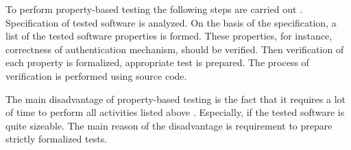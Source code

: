 %
To perform property-based testing the following steps are carried out . 
%
Specification of tested software is analyzed. 
%
On the basis of the specification, a list of the tested software properties is formed. 
%
These properties, for instance, correctness of authentication mechanism, should be verified. 
%
Then verification of each property is formalized, \The appropriate test is prepared. 
%
The process of verification is performed using source code. 

%
The main disadvantage of property-based testing is the fact that it requires a lot of time to perform all activities listed above . 
%
Especially, if the tested software is quite sizeable. 
%
The main reason of the disadvantage is \The requirement to prepare strictly formalized tests.